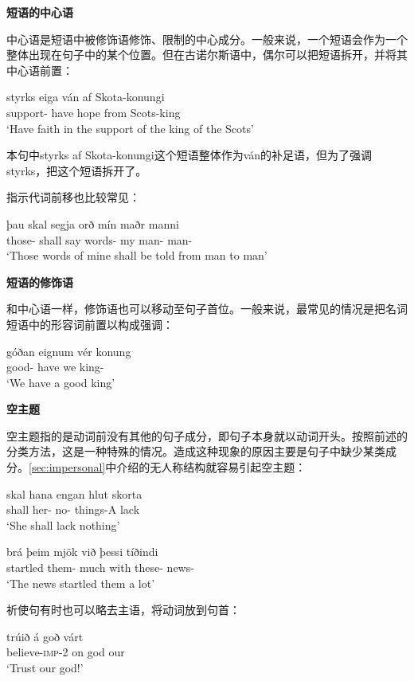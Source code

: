 \textbf{短语的中心语}

中心语是短语中被修饰语修饰、限制的中心成分。一般来说，一个短语会作为一个整体出现在句子中的某个位置。但在古诺尔斯语中，偶尔可以把短语拆开，并将其中心语前置：
\begin{exe}
    \ex \gll
    styrks	eiga	ván	af	Skota-konungi\\
support-{\gen}	have	hope	from	Scots-king\\
\trans `Have faith in the support of the king of the Scots’
\end{exe}

本句中styrks af Skota-konungi这个短语整体作为ván的补足语，但为了强调styrks，把这个短语拆开了。

指示代词前移也比较常见：
\begin{exe}
    \ex \gll
    þau	skal	segja	orð	mín	maðr	manni\\
those-{\acc}	shall	say	words-{\acc}	my	man-{\nom}	man-{\dat}\\
\trans `Those words of mine shall be told from man to man’
\end{exe}

\textbf{短语的修饰语}

和中心语一样，修饰语也可以移动至句子首位。一般来说，最常见的情况是把名词短语中的形容词前置以构成强调：
\begin{exe}
    \ex \gll
    góðan	eignum	vér	konung\\
good-{\acc}	have	we	king-{\acc}\\
\trans `We have a good king’
    
\end{exe}

\textbf{空主题}

空主题指的是动词前没有其他的句子成分，即句子本身就以动词开头。按照前述的分类方法，这是一种特殊的情况。造成这种现象的原因主要是句子中缺少某类成分。\ref{sec:impersonal}中介绍的无人称结构就容易引起空主题：
\begin{exe}
    \ex \gll
    skal	hana	engan	hlut	skorta\\
shall	her-{\acc}	no-{\acc}	things-A	lack\\
\trans `She shall lack nothing’

\ex \gll
brá	þeim	mjök	við	þessi	tíðindi\\
startled	them-{\dat}	much	with	these-{\acc}	news-{\acc}\\
\trans `The news startled them a lot’
\end{exe}

祈使句有时也可以略去主语，将动词放到句首：
\begin{exe}
    \ex \gll
    trúið	á	goð	várt\\
believe-\textsc{imp}-{\footnotesize 2}{\pl}	on	god	our\\
\trans `Trust our god!’
\end{exe}

